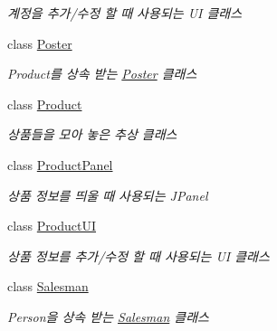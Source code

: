 \begin{DoxyCompactItemize}
\begin{DoxyCompactList}\small\item\em 계정을 추가/수정 할 때 사용되는 UI 클래스 \end{DoxyCompactList}\item 
class \hyperlink{classpkg_1_1_poster}{Poster}
\begin{DoxyCompactList}\small\item\em Product를 상속 받는 \hyperlink{classpkg_1_1_poster}{Poster} 클래스 \end{DoxyCompactList}\item 
class \hyperlink{classpkg_1_1_product}{Product}
\begin{DoxyCompactList}\small\item\em 상품들을 모아 놓은 추상 클래스 \end{DoxyCompactList}\item 
class \hyperlink{classpkg_1_1_product_panel}{Product\+Panel}
\begin{DoxyCompactList}\small\item\em 상품 정보를 띄울 때 사용되는 J\+Panel \end{DoxyCompactList}\item 
class \hyperlink{classpkg_1_1_product_u_i}{Product\+UI}
\begin{DoxyCompactList}\small\item\em 상품 정보를 추가/수정 할 때 사용되는 UI 클래스 \end{DoxyCompactList}\item 
class \hyperlink{classpkg_1_1_salesman}{Salesman}
\begin{DoxyCompactList}\small\item\em Person을 상속 받는 \hyperlink{classpkg_1_1_salesman}{Salesman} 클래스 \end{DoxyCompactList}\end{DoxyCompactItemize}
